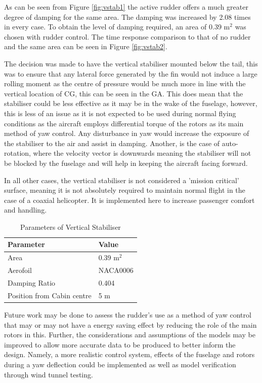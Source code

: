 \documentclass[11pt,a4paper]{article}
\begin{document}
 As can be seen from Figure \ref{fig:vstab1} the active rudder offers a much greater degree of damping for the same area. The damping was increased by 2.08 times in every case. To obtain the level of damping required, an area of 0.39 m$^2$ was chosen with rudder control. The time response comparison to that of no rudder and the same area can be seen in Figure \ref{fig:vstab2}.

The decision was made to have the vertical stabiliser mounted below the tail, this was to ensure that any lateral force generated by the fin would not induce a large rolling moment as the centre of pressure would be much more in line with the vertical location of CG, this can be seen in the GA. This does mean that the stabiliser could be less effective as it may be in the wake of the fuselage, however, this is less of an issue as it is not expected to be used during normal flying conditions as the aircraft employs differential torque of the rotors as its main method of yaw control. Any disturbance in yaw would increase the exposure of the stabiliser to the air and assist in damping. Another, is the case of auto-rotation, where the velocity vector is downwards meaning the stabiliser will not be blocked by the fuselage and will help in keeping the aircraft facing forward.

In all other cases, the vertical stabiliser is not considered a 'mission critical' surface, meaning it is not absolutely required to maintain normal flight in the case of a coaxial helicopter. It is implemented here to increase passenger comfort and handling.
\begin{table}[H]
\centering 
    \caption{Parameters of Vertical Stabiliser}
\begin{tabular}{ll}
\hline
  \rowcolor[HTML]{DAE8FC} 
  Parameter & Value  \\ \hline
   Area  & 0.39 m$^2$\\
   Aerofoil & NACA0006\\
   Damping Ratio & 0.404\\
   Position from Cabin centre & 5 m\\
   \hline
\end{tabular}{}
    \label{tab:vstab}
\end{table}{}
Future work may be done to assess the rudder's use as a method of yaw control that may or may not have a energy saving effect by  reducing the role of the main rotors in this. Further, the considerations and assumptions of the models may be improved to allow more accurate data to be produced to better inform the design. Namely, a more realistic control system, effects of the fuselage and rotors during a yaw deflection could be implemented as well as model verification through wind tunnel testing.
%
%
\end{document}
